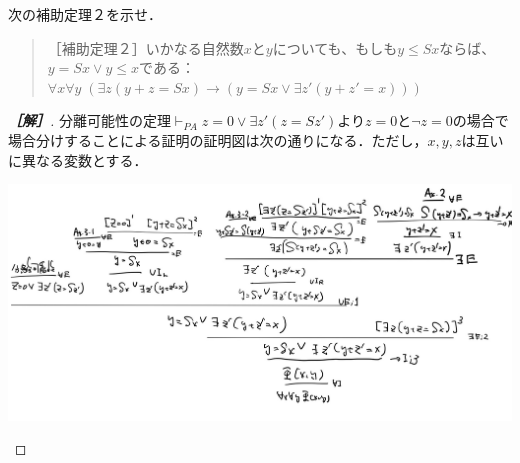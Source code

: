 \documentclass[uplatex,dvipdfmx]{jsarticle}
\begin{document}
\begin{problem}
    次の補助定理２を示せ．
    \begin{quote}
        ［補助定理２］いかなる自然数$x$と$y$についても、もしも$y\le Sx$ならば、$y=Sx\lor y\le x$である：
        $\forall x\forall y\;(\exists z(y+z=Sx)\to (y=Sx\lor\exists z'(y+z'=x)))$
    \end{quote}
\end{problem}
\begin{proof}[\bf{［解］}]
    分離可能性の定理$\vdash_{PA}z=0\lor\exists z'(z=Sz')$より$z=0$と$\lnot z=0$の場合で場合分けすることによる証明の証明図は次の通りになる．ただし，$x,y,z$は互いに異なる変数とする．
    \begin{center}
        \includegraphics[width=15cm]{figure3-3.jpg}
    \end{center}
\end{proof}
\end{document}
